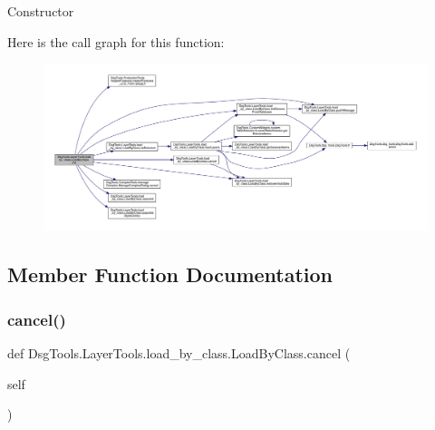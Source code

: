 \begin{DoxyVerb}Constructor
\end{DoxyVerb}
 Here is the call graph for this function\+:
\nopagebreak
\begin{figure}[H]
\begin{center}
\leavevmode
\includegraphics[width=350pt]{class_dsg_tools_1_1_layer_tools_1_1load__by__class_1_1_load_by_class_ab9a30d1e698158414c0fd302f1db3ab7_cgraph}
\end{center}
\end{figure}


\subsection{Member Function Documentation}
\mbox{\label{class_dsg_tools_1_1_layer_tools_1_1load__by__class_1_1_load_by_class_a9648d37e3fa7311e4cb454089d3b768a}} 
\subsubsection{\texorpdfstring{cancel()}{cancel()}}
{\footnotesize\ttfamily def Dsg\+Tools.\+Layer\+Tools.\+load\+\_\+by\+\_\+class.\+Load\+By\+Class.\+cancel (\begin{DoxyParamCaption}\item[{}]{self }\end{DoxyParamCaption})}

